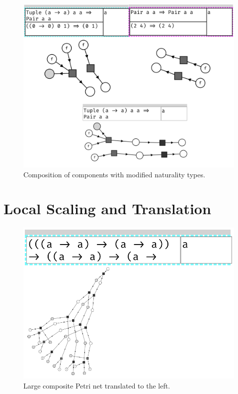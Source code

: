 \documentclass[11pt,openright,hidelinks,a4paper]{article}
\begin{document}
\begin{figure}[H]
\begin{center}
\includegraphics[scale=0.45]{natcompose}
\end{center}
\caption{Composition of components with modified naturality types.}
\label{fig:natcompose2}
\end{figure}

\section{Local Scaling and Translation}\label{app:zoomtrans}

\begin{figure}[H]
\begin{center}
\includegraphics[scale=0.45]{lefttranslate}
\end{center}
\caption{Large composite Petri net translated to the left.}
\label{fig:lefttranslate}
\end{figure}
\end{document}
